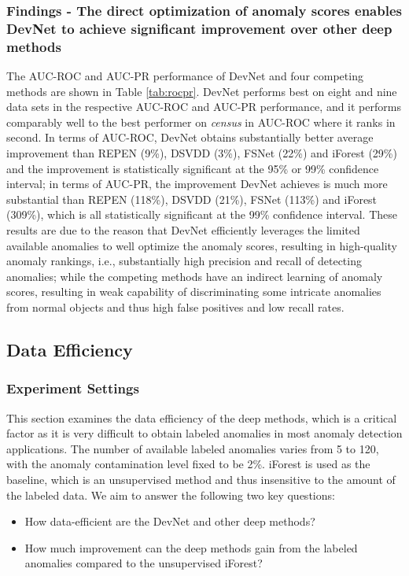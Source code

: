 \documentclass[sigconf]{acmart}
\begin{document}
\subsubsection{Findings - The direct optimization of anomaly scores enables DevNet to achieve significant improvement over other deep methods}
The AUC-ROC and AUC-PR performance of DevNet and four competing methods are shown in Table \ref{tab:rocpr}. DevNet performs best on eight and nine data sets in the respective AUC-ROC and AUC-PR performance, and it performs comparably well to the best performer on \textit{census} in AUC-ROC where it ranks in second. In terms of AUC-ROC, DevNet obtains substantially better average improvement than REPEN (9\%), DSVDD (3\%), FSNet (22\%) and iForest (29\%) and the improvement is statistically significant at the 95\% or 99\% confidence interval; in terms of AUC-PR, the improvement DevNet achieves is much more substantial than REPEN (118\%), DSVDD (21\%), FSNet (113\%) and iForest (309\%), which is all statistically significant at the 99\% confidence interval. These results are due to the reason that DevNet efficiently leverages the limited available anomalies to well optimize the anomaly scores, resulting in high-quality anomaly rankings, i.e., substantially high precision and recall of detecting anomalies; while the competing methods have an indirect learning of anomaly scores, resulting in weak capability of discriminating some intricate anomalies from normal objects and thus high false positives and low recall rates.


\subsection{Data Efficiency}\label{exp:labeledanomalies}


\subsubsection{Experiment Settings}
This section examines the data efficiency of the deep methods, which is a critical factor as it is very difficult to obtain labeled anomalies in most anomaly detection applications. The number of available labeled anomalies varies from 5 to 120, with the anomaly contamination level fixed to be 2\%. iForest is used as the baseline, which is an unsupervised method and thus insensitive to the amount of the labeled data. We aim to answer the following two key questions:
\begin{itemize}
    \item How data-efficient are the DevNet and other deep methods?
    \item How much improvement can the deep methods gain from the labeled anomalies compared to the unsupervised iForest?
\end{itemize}
\end{document}
